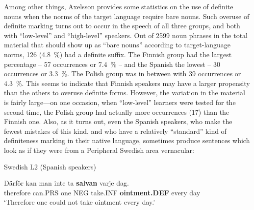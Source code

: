 Among other things, Axelsson provides some statistics on the use of definite nouns when the norms of the target language require bare nouns. Such overuse of definite marking turns out to occur in the speech of all three groups, and both with “low-level” and “high-level” speakers. Out of 2599 noun phrases in the total material that should show up as “bare nouns” according to target-language norms, 126 (4.8~\%) had a definite suffix. The Finnish group had the largest percentage – 57 occurrences or 7.4~\% – and the Spanish the lowest – 30 occurrences or 3.3~\%. The Polish group was in between with 39 occurrences or 4.3~\%. This seems to indicate that Finnish speakers may have a larger propensity than the others to overuse definite forms. However, the variation in the material is fairly large—on one occasion, when “low-level” learners were tested for the second time, the Polish group had actually more occurrences (17) than the Finnish one. Also, as it turns out, even the Spanish speakers, who make the fewest mistakes of this kind, and who have a relatively “standard” kind of definiteness marking in their native language, sometimes produce sentences which look as if they were from a Peripheral Swedish area vernacular:


\item 

Swedish L2 (Spanish speakers)



\item 


 \ea\label{}
\gll Därför  kan  man  inte  ta  \textbf{salvan} varje  dag.  \\


therefore  can.PRS  one  NEG  take.INF  \textbf{ointment.DEF} every  day  \\

\glt ‘Therefore one could not take ointment every day.’

